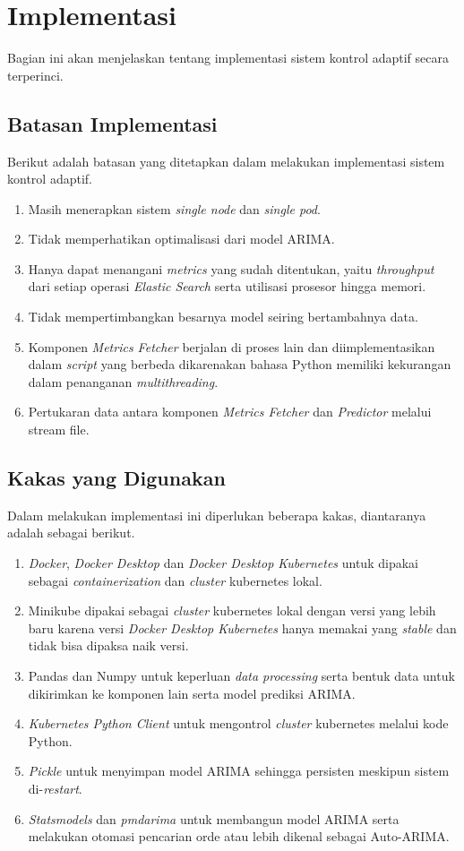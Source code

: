 \section{Implementasi}

Bagian ini akan menjelaskan tentang implementasi sistem kontrol adaptif secara terperinci.

\subsection{Batasan Implementasi}
Berikut adalah batasan yang ditetapkan dalam melakukan implementasi sistem kontrol adaptif.
\begin{enumerate}
    \item Masih menerapkan sistem \textit{single node} dan \textit{single pod}.
    \item Tidak memperhatikan optimalisasi dari model ARIMA.
    \item Hanya dapat menangani \textit{metrics} yang sudah ditentukan, yaitu \textit{throughput} dari setiap operasi \textit{Elastic Search} serta utilisasi prosesor hingga memori.
    \item Tidak mempertimbangkan besarnya model seiring bertambahnya data.
    \item Komponen \textit{Metrics Fetcher} berjalan di proses lain dan diimplementasikan dalam \textit{script} yang berbeda dikarenakan bahasa Python memiliki kekurangan dalam penanganan \textit{multithreading}.
    \item Pertukaran data antara komponen \textit{Metrics Fetcher} dan \textit{Predictor} melalui stream file.
\end{enumerate}

\subsection{Kakas yang Digunakan}
Dalam melakukan implementasi ini diperlukan beberapa kakas, diantaranya adalah sebagai berikut.
\begin{enumerate}
    \item \textit{Docker}, \textit{Docker Desktop} dan \textit{Docker Desktop Kubernetes} untuk dipakai sebagai \textit{containerization} dan \textit{cluster} kubernetes lokal.
    \item Minikube dipakai sebagai \textit{cluster} kubernetes lokal dengan versi yang lebih baru karena versi \textit{Docker Desktop Kubernetes} hanya memakai yang \textit{stable} dan tidak bisa dipaksa naik versi.
    \item Pandas dan Numpy untuk keperluan \textit{data processing} serta bentuk data untuk dikirimkan ke komponen lain serta model prediksi ARIMA.
    \item \textit{Kubernetes Python Client} untuk mengontrol \textit{cluster} kubernetes melalui kode Python.
    \item \textit{Pickle} untuk menyimpan model ARIMA sehingga persisten meskipun sistem di-\textit{restart}.
    \item \textit{Statsmodels} dan \textit{pmdarima} untuk membangun model ARIMA serta melakukan otomasi pencarian orde atau lebih dikenal sebagai Auto-ARIMA.
\end{enumerate}

